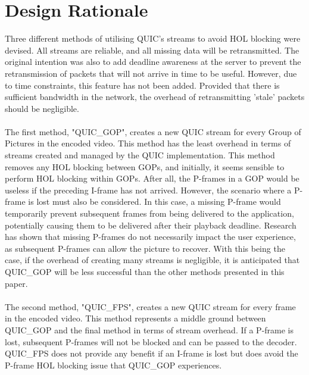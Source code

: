 \documentclass{mpaper}
\begin{document}
\section{Design Rationale} \label{Design Rationale}

\noindent Three different methods of utilising QUIC's streams to avoid HOL blocking were devised. All streams are reliable, and all missing data will be retransmitted. The original intention was also to add deadline awareness at the server to prevent the retransmission of packets that will not arrive in time to be useful. However, due to time constraints, this feature has not been added. Provided that there is sufficient bandwidth in the network, the overhead of retransmitting 'stale' packets should be negligible.
\\\\
The first method, "QUIC\_GOP", creates a new QUIC stream for every Group of Pictures in the encoded video. This method has the least overhead in terms of streams created and managed by the QUIC implementation. This method removes any HOL blocking between GOPs, and initially, it seems sensible to perform HOL blocking within GOPs. After all, the P-frames in a GOP would be useless if the preceding I-frame has not arrived. However, the scenario where a P-frame is lost must also be considered. In this case, a missing P-frame would temporarily prevent subsequent frames from being delivered to the application, potentially causing them to be delivered after their playback deadline. Research has shown that missing P-frames do not necessarily impact the user experience, as subsequent P-frames can allow the picture to recover\cite{FrameRecovery}. With this being the case, if the overhead of creating many streams is negligible, it is anticipated that QUIC\_GOP will be less successful than the other methods presented in this paper.
\\\\
The second method, "QUIC\_FPS", creates a new QUIC stream for every frame in the encoded video. This method represents a middle ground between QUIC\_GOP and the final method in terms of stream overhead. If a P-frame is lost, subsequent P-frames will not be blocked and can be passed to the decoder. QUIC\_FPS does not provide any benefit if an I-frame is lost but does avoid the P-frame HOL blocking issue that QUIC\_GOP experiences.
\\\\
\end{document}
